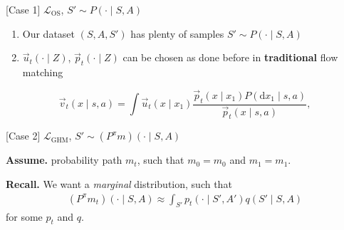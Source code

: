 \documentclass{beamer}
\begin{document}
    \begin{frame}
        \begin{minipage}{0.5\linewidth}
            [Case 1]{
        \( \mathcal{L}_{\mathrm{OS}} \), \( S' \sim P(\cdot \mid S, A) \)
            }
        \end{minipage}
        \begin{enumerate}
            \item Our dataset \( (S, A, S') \) has plenty of samples \( S' \sim P(\cdot \mid S,A) \)
            \item \( \vec{u}_t(\cdot \mid Z) \), \( \vec{p}_t(\cdot \mid Z) \) can be chosen as done before in \textbf{traditional} flow matching
        \end{enumerate}
\[ \vec{v}_t(x \mid s, a) = \int \vec{u}_{t}(x \mid x_1) \frac{\vec{p}_{t}(x \mid x_1) P(\mathrm{d}x_1 \mid s, a)}{\vec{p}_t(x \mid s, a)}, \]
    \end{frame}
    \begin{frame}
        \begin{minipage}{0.6\linewidth}
            [Case 2]{
                \( \mathcal{L}_{\mathrm{GHM}} \), \( S' \sim (P^{\pi} m)(\cdot \mid S, A) \)
            }
        \end{minipage}
        \par
        \textbf{Assume.} probability path \( m_t \), such that \( m_{0} = m_{0} \) and \( m_{1} = m_{1} \).
        \par
        \textbf{Recall.} We want a \emph{marginal} distribution, such that
        \begin{align*}
            (P^{\pi} m_t)(\cdot \mid S, A) \approx \int_{S'} p_t(\cdot \mid S', A') q(S' \mid S, A)
        \end{align*}
        for some \( p_t \) and \( q \).
        \par
    \end{frame}
\end{document}

